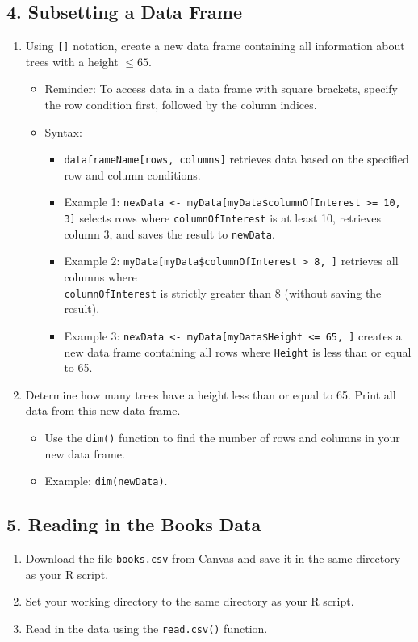 \documentclass{article}
\begin{document}
\subsection*{4. Subsetting a Data Frame}
\begin{enumerate}
    \item Using \texttt{[]} notation, create a new data frame containing all information about trees with a height \(\leq 65\).
    \begin{itemize}
        \item Reminder: To access data in a data frame with square brackets, specify the row condition first, followed by the column indices.
        \item Syntax:
        \begin{itemize}
            \item \texttt{dataframeName[rows, columns]} retrieves data based on the specified row and column conditions.
            \item Example 1: \texttt{newData <- myData[myData\$columnOfInterest >= 10, 3]} selects rows where \texttt{columnOfInterest} is at least 10, retrieves column 3, and saves the result to \texttt{newData}.
            \item Example 2: \texttt{myData[myData\$columnOfInterest > 8, ]} retrieves all columns where\\
            \texttt{columnOfInterest} is strictly greater than 8 (without saving the result).
            \item Example 3: \texttt{newData <- myData[myData\$Height <= 65, ]} creates a new data frame containing all rows where \texttt{Height} is less than or equal to 65.
        \end{itemize}
    \end{itemize}
    \item Determine how many trees have a height less than or equal to 65. Print all data from this new data frame.
    \begin{itemize}
        \item Use the \texttt{dim()} function to find the number of rows and columns in your new data frame.
        \item Example: \texttt{dim(newData)}.
    \end{itemize}
\end{enumerate}


\subsection*{5. Reading in the Books Data}
\begin{enumerate}
    \item Download the file \texttt{books.csv} from Canvas and save it in the same directory as your R script.
    \item Set your working directory to the same directory as your R script.
    \item Read in the data using the \texttt{read.csv()} function.
\end{enumerate}
\end{document}
